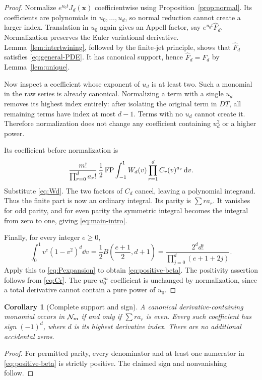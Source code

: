 \documentclass[11pt,letterpaper]{article}
\numberwithin{equation}{section}
\theoremstyle{plain}
\newtheorem{corollary}[theorem]{Corollary}
\theoremstyle{definition}
\theoremstyle{remark}
\begin{document}
\begin{proof}
Normalize $e^{u_0t}J_d(\boldsymbol x)$ coefficientwise using Proposition~\ref{prop:normal}. Its coefficients are polynomials in $u_0,\ldots,u_d$, so normal reduction cannot create a larger index. Translation in $u_0$ again gives an Appell factor, say $e^{u_0t}\widehat F_d$. Normalization preserves the Euler variational derivative. Lemma~\ref{lem:intertwining}, followed by the finite-jet principle, shows that $\widehat F_d$ satisfies \eqref{eq:general-PDE}. It has canonical support, hence $\widehat F_d=F_d$ by Lemma~\ref{lem:unique}.

Now inspect a coefficient whose exponent of $u_d$ is at least two. Such a monomial in the raw series is already canonical. Normalizing a term with a single $u_d$ removes its highest index entirely: after isolating the original term in $DT$, all remaining terms have index at most $d-1$. Terms with no $u_d$ cannot create it. Therefore normalization does not change any coefficient containing $u_d^2$ or a higher power.

Its coefficient before normalization is
\[
 \frac{m!}{\prod_{r=0}^d a_r!}\,
 \frac12\operatorname{FP}\int_{-1}^1W_d(v)\prod_{r=1}^dC_r(v)^{a_r}\,\mathrm d v.
\]
Substitute \eqref{eq:Wd}. The two factors of $C_d$ cancel, leaving a polynomial integrand. Thus the finite part is now an ordinary integral. Its parity is $\sum r a_r$. It vanishes for odd parity, and for even parity the symmetric integral becomes the integral from zero to one, giving \eqref{eq:main-intro}.

Finally, for every integer $e\ge0$,
\begin{equation}\label{eq:beta-elementary}
 \int_0^1v^e(1-v^2)^d\dd v
 =\frac12 B\left(\frac{e+1}{2},d+1\right)
 =\frac{2^d d!}{\prod_{j=0}^d(e+1+2j)}.
\end{equation}
Apply this to \eqref{eq:Pexpansion} to obtain \eqref{eq:positive-beta}. The positivity assertion follows from \eqref{eq:Cr}. The pure $u_0^m$ coefficient is unchanged by normalization, since a total derivative cannot contain a pure power of $u_0$.
\end{proof}

\begin{corollary}[Complete support and sign]\label{cor:sign}
A canonical derivative-containing monomial occurs in $\mathcal N_m$ if and only if $\sum r a_r$ is even. Every such coefficient has sign $(-1)^d$, where $d$ is its highest derivative index. There are no additional accidental zeros.
\end{corollary}
\begin{proof}
For permitted parity, every denominator and at least one numerator in \eqref{eq:positive-beta} is strictly positive. The claimed sign and nonvanishing follow.
\end{proof}
\end{document}
